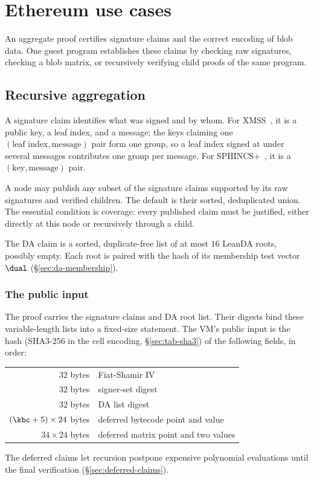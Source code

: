 \section{Ethereum use cases}\label{sec:ethereum}

An aggregate proof certifies signature claims and the correct encoding of blob data. One guest program establishes these claims by checking raw signatures, checking a blob matrix, or recursively verifying child proofs of the same program.

\subsection{Recursive aggregation}\label{sec:recursion}\label{sec:xmss-agg}\label{sec:sphincs-agg}

A signature claim identifies what was signed and by whom. For XMSS~\cite{rfc8391}, it is a public key, a leaf index, and a message; the keys claiming one $(\text{leaf index},\text{message})$ pair form one group, so a leaf index signed at under several messages contributes one group per message. For SPHINCS+~\cite{sphincs}, it is a $(\text{key},\text{message})$ pair.

A node may publish any subset of the signature claims supported by its raw signatures and verified children. The default is their sorted, deduplicated union. The essential condition is coverage: every published claim must be justified, either directly at this node or recursively through a child.

The DA claim is a sorted, duplicate-free list of at most $16$ LeanDA roots, possibly empty. Each root is paired with the hash of its membership test vector $\dual$ (\S\ref{sec:da-membership}). 

\subsubsection{The public input}\label{sec:rec-stmt}

The proof carries the signature claims and DA root list. Their digests bind these variable-length lists into a fixed-size statement. The VM's public input is the hash (SHA3-256 in the cell encoding, \S\ref{sec:tab-sha3}) of the following fields, in order:
\begin{center}
\begin{tabular}{@{}rl@{}}
\hline
$32$ bytes & Fiat-Shamir IV\\
$32$ bytes & signer-set digest\\
$32$ bytes & DA list digest\\
$(\kbc+5)\times24$ bytes & deferred bytecode point and value\\
$34\times24$ bytes & deferred matrix point and two values\\
\hline
\end{tabular}
\end{center}
The deferred claims let recursion postpone expensive polynomial evaluations until the final verification (\S\ref{sec:deferred-claims}).

